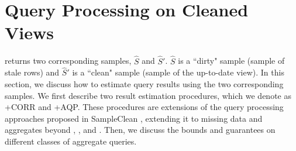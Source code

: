 \section{Query Processing on Cleaned Views}
\label{correction}
\svc returns two corresponding samples, $\widehat{S}$ and $\widehat{S}'$.
$\widehat{S}$ is a ``dirty" sample (sample of stale rows) and $\widehat{S}'$ is a ``clean" sample (sample of the up-to-date view).
In this section, we discuss how to estimate query results using the two corresponding samples. 
We first describe two result estimation procedures, which we denote as \svcnospace+CORR and \svcnospace+AQP.
These procedures are extensions of the query processing approaches proposed in SampleClean \cite{wang1999sample}, extending it to missing data and aggregates beyond \sumfunc, \countfunc, and \avgfunc.
Then, we discuss the bounds and guarantees on different classes of aggregate queries.





